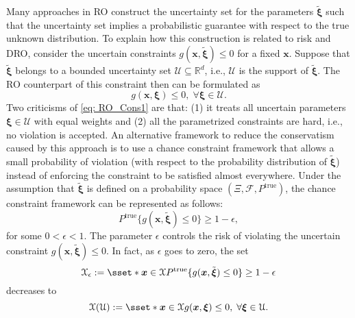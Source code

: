 \documentclass[final,onefignum,onetabnum]{class}
\newcommand{\vvar}[2]{\mathrm{VaR}_{#1} \left[ #2 \right]}
\newcommand{\bs}[1]{\boldsymbol{#1}} %
\newcommand{\Bs}[1]{\mathbb{#1}} %
\newcommand{\Ts}[1]{\mathbbmtt{#1}} %
\newcommand{\Cs}[1]{\mathcal{#1}} %
\newcommand{\txi}{\tilde{\bs{\xi}}}
\newcommand{\trueP}{\Ts{P}^{\text{true}}}
\newcommand{\trueProb}[1]{\Ts{P}^{\text{true}} \{#1 \} }
\newcommand{\dro}{DRO}
\begin{document}
Many approaches in RO construct  the uncertainty set for the parameters $\txi$ such that the uncertainty set implies a probabilistic guarantee  with respect to the true unknown distribution. 
To explain how this construction is related to risk and \dro, consider the uncertain constraints $g(\bs{x}, \txi) \le 0$ for  a fixed $\bs{x}$. Suppose that $\txi$ belongs to a bounded uncertainty set $\Cs{U} \subseteq \Bs{R}^{d}$, i.e.,  $\Cs{U}$ is the support of $\txi$. The RO counterpart of this constraint then can be formulated as 
\begin{equation}
	\label{eq: RO_Cons1}
	g(\bs{x}, \bs{\xi}) \le 0, \; \forall \bs{\xi} \in \Cs{U}. 
\end{equation}
Two criticisms of \eqref{eq: RO_Cons1} are that: (1) it treats all uncertain parameters $\bs{\xi} \in \Cs{U}$  with equal weights and (2) all the parametrized constraints are hard, i.e., no violation is accepted. An alternative framework to reduce the conservatism caused by this approach is to use a chance constraint framework that allows a small probability of violation (with respect to the  probability distribution of $\txi$) instead of enforcing the constraint to be satisfied almost everywhere. %
Under the assumption that   $\txi $ is defined on a probability space $(\Xi, \Cs{F}, P^{\text{true}})$,  %
the chance constraint framework can be represented as follows: 
\begin{equation}
	\label{eq: chance}
	P^{\text{true}}\{g(\bs{x}, \txi) \le 0 \} \ge 1-\epsilon,
\end{equation}  
for some $0<\epsilon <1 $. The parameter $\epsilon$ controls the risk of violating the uncertain constraint $g(\bs{x}, \txi) \le 0$. In fact,  as $\epsilon$ goes to zero, the set   $$\Cs{X}_{\epsilon}:=\sset*{\bs{x} \in \Cs{X} }{P^{\text{true}}\{g(\bs{x}, \txi) \le 0 \} \ge 1-\epsilon}$$  decreases to $$\Cs{X}(\Cs{U}):=\sset*{ \bs{x} \in \Cs{X} }{ g(\bs{x}, \bs{\xi}) \le 0, \; \forall \bs{\xi} \in \Cs{U} }.$$ 
\end{document}
